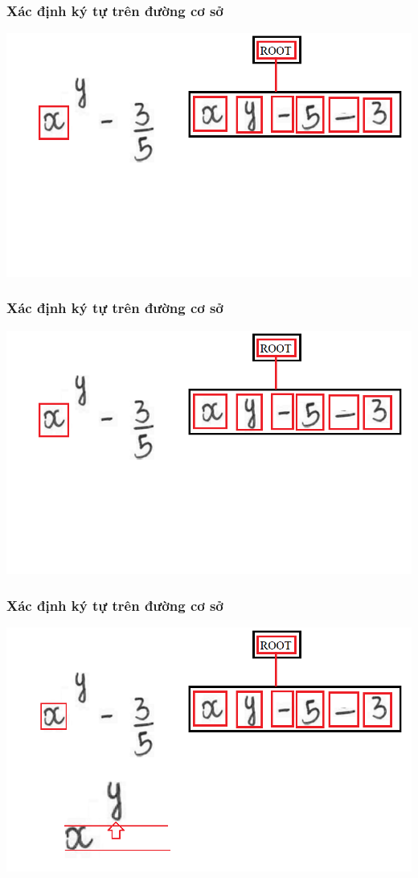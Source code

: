 \documentclass{beamer}
\begin{document}
\begin{frame}
	\frametitle{Xác định ký tự trên đường cơ sở}
	\begin{center}
		\centering
		\includegraphics[width=0.6\linewidth]{hor1.png}
	\end{center}
\end{frame}

\begin{frame}
	\frametitle{Xác định ký tự trên đường cơ sở}
	\begin{center}
		\centering
		\includegraphics[width=0.6\linewidth]{hor1.png}
	\end{center}
\end{frame}

\begin{frame}
	\frametitle{Xác định ký tự trên đường cơ sở}
	\begin{center}
		\centering
		\includegraphics[width=0.6\linewidth]{hor2.png}
	\end{center}
\end{frame}
\end{document}
